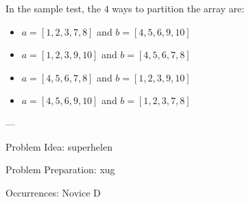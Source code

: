In the sample test, the $4$ ways to partition the array are:
\begin{itemize}
\item $a=[1,2,3,7,8]$ and $b=[4,5,6,9,10]$
\item $a=[1,2,3,9,10]$ and $b=[4,5,6,7,8]$
\item $a=[4,5,6,7,8]$ and $b=[1,2,3,9,10]$
\item $a=[4,5,6,9,10]$ and $b=[1,2,3,7,8]$
\end{itemize}

---

Problem Idea: superhelen

Problem Preparation: xug

Occurrences: Novice D
